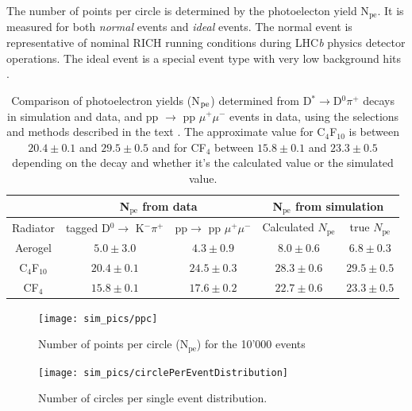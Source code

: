 \documentclass[11pt,twoside]{scrreprt}
\begin{document}
The number of points per circle is determined by the photoelecton yield N$_\text{pe}$. It is measured for both \emph{normal} events and \emph{ideal}
events. The normal event is representative of nominal RICH running conditions during LHC\textit{b} physics detector operations. The ideal event is
a special event type with very low background hits \cite{RICHPerf2012}.

\begin{table}[tb]
\centering
\begin{tabular}{|c| c| c | c |c|}
\hline\hline
 & \multicolumn{2}{|c|}{N$_{\text{pe}}$ from data} & \multicolumn{2}{|c|}{N$_{\text{pe}}$ from simulation} \\ \hline
Radiator &  tagged D$^0 \rightarrow$ K$^- \pi^+$ &pp$ \rightarrow$ pp $\mu^+ \mu^-$ & Calculated $N_{\text{pe}}$ & true $N_{\text{pe}}$ \\ [0.5ex]
\hline
Aerogel & $5.0 \pm 3.0$  & $4.3 \pm 0.9$& $8.0 \pm 0.6$ & $6.8 \pm 0.3$ \\ \hline
C$_4$F$_{10}$  & $20.4 \pm 0.1$ & $24.5 \pm 0.3$& $28.3 \pm 0.6$ & $29.5 \pm 0.5$ \\ \hline
CF$_4$ & $ 15.8 \pm 0.1$  & $ 17.6 \pm 0.2$& $22.7 \pm 0.6$ & $23.3 \pm 0.5$ \\ 
\hline
\end{tabular}
\caption[Comparison of photoelectron yields (N$_{\rm pe}$)]{Comparison of photoelectron yields (N$_{\rm pe}$) determined from
D$^* \rightarrow$D$^0\pi^+$ decays in simulation and data, and 
pp $\rightarrow$ pp $\mu^+ \mu^-$ events in data, using the selections and 
methods described in the text \cite{RICHPerf2012}. The approximate value for 
C$_4$F$_{10}$ is between  $20.4 \pm 0.1$ and $29.5 \pm 0.5$ and for CF$_4$ between
$ 15.8 \pm 0.1$ and $23.3 \pm 0.5$ depending on the decay and whether it's the 
calculated value or the simulated value.}
\label{table:results}
\end{table}

\begin{figure}[tb]
  \centering
  \texttt{[image: sim\_pics/ppc]}
  \caption{Number of points per circle (N$_\text{pe}$) for the 10'000 events}
  \label{fig:ppc1}
\end{figure}

\begin{figure}[tb]
  \centering
  \texttt{[image: sim\_pics/circlePerEventDistribution]}
  \caption{Number of circles per single event distribution.}
  \label{fig:circlePerEventDist}
\end{figure}
\end{document}
